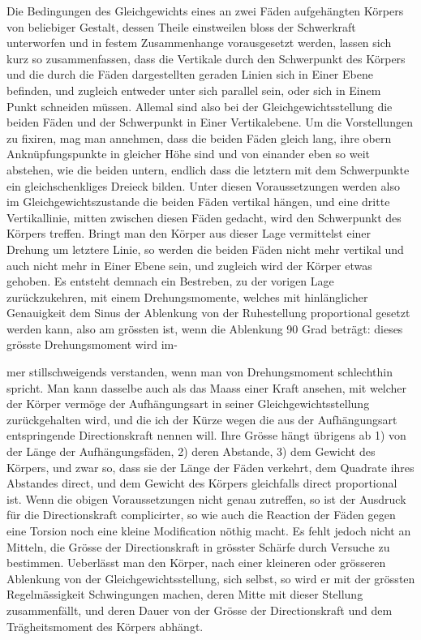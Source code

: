 Die Bedingungen des Gleichgewichts eines an zwei Fäden aufgehängten Körpers von beliebiger Gestalt, dessen Theile einstweilen bloss der Schwerkraft unterworfen und in festem Zusammenhange vorausgesetzt werden, lassen sich kurz so zusammenfassen, dass die Vertikale durch den Schwerpunkt des Körpers und die durch die Fäden dargestellten geraden Linien sich in Einer Ebene befinden, und zugleich entweder unter sich parallel sein, oder sich in Einem Punkt schneiden müssen. Allemal sind also bei der Gleichgewichtsstellung die beiden Fäden und der Schwerpunkt in Einer Vertikalebene. Um die Vorstellungen zu fixiren, mag man annehmen, dass die beiden Fäden gleich lang, ihre obern Anknüpfungspunkte in gleicher Höhe sind und von einander eben so weit abstehen, wie die beiden untern, endlich dass die letztern mit dem Schwerpunkte ein gleichschenkliges Dreieck bilden. Unter diesen Voraussetzungen werden also im Gleichgewichtszustande die beiden Fäden vertikal hängen, und eine dritte Vertikallinie, mitten zwischen diesen Fäden gedacht, wird den Schwerpunkt des Körpers treffen. Bringt man den Körper aus dieser Lage vermittelst einer Drehung um letztere Linie, so werden die beiden Fäden nicht mehr vertikal und auch nicht mehr in Einer Ebene sein, und zugleich wird der Körper etwas gehoben. Es entsteht demnach ein Bestreben, zu der vorigen Lage zurückzukehren, mit einem Drehungsmomente, welches mit hinlänglicher Genauigkeit dem Sinus der Ablenkung von der Ruhestellung proportional gesetzt werden kann, also am grössten ist, wenn die Ablenkung 90 Grad beträgt: dieses grösste Drehungsmoment wird im-
\par\clearpage
{}
\noindent mer stillschweigends verstanden, wenn man von Drehungsmoment schlechthin spricht. Man kann dasselbe auch als das Maass einer Kraft ansehen, mit welcher der Körper vermöge der Aufhängungsart in seiner Gleichgewichtsstellung zurückgehalten wird, und die ich der Kürze wegen die aus der Aufhängungsart entspringende Directionskraft nennen will. Ihre Grösse hängt übrigens ab 1) von der Länge der Aufhängungsfäden, 2) deren Abstande, 3) dem Gewicht des Körpers, und zwar so, dass sie der Länge der Fäden verkehrt, dem Quadrate ihres Abstandes direct, und dem Gewicht des Körpers gleichfalls direct proportional ist. Wenn die obigen Voraussetzungen nicht genau zutreffen, so ist der Ausdruck für die Directionskraft complicirter, so wie auch die Reaction der Fäden gegen eine Torsion noch eine kleine Modification nöthig macht. Es fehlt jedoch nicht an Mitteln, die Grösse der Directionskraft in grösster Schärfe durch Versuche zu bestimmen. Ueberlässt man den Körper, nach einer kleineren oder grösseren Ablenkung von der Gleichgewichtsstellung, sich selbst, so wird er mit der grössten Regelmässigkeit Schwingungen machen, deren Mitte mit dieser Stellung zusammenfällt, und deren Dauer von der Grösse der Directionskraft und dem Trägheitsmoment des Körpers abhängt.

